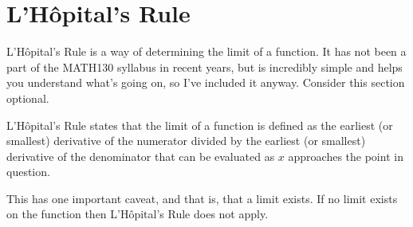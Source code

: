 \chapter{L'H\^{o}pital's Rule}
\label{chap:LHopitalsRule}
L'H\^{o}pital's Rule is a way of determining the limit of a function. It has not
been a part of the MATH130 syllabus in recent years, but is incredibly simple
and helps you understand what's going on, so I've included it anyway. Consider
this section optional.

L'H\^{o}pital's Rule states that the limit of a function is defined as the
earliest (or smallest) derivative of the numerator divided by the earliest (or
smallest) derivative of the denominator that can be evaluated as $x$ approaches
the point in question.

This has one important caveat, and that is, that a limit exists. If no limit
exists on the function then L'H\^{o}pital's Rule does not apply.

